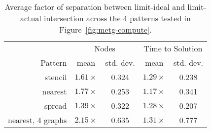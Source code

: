 \begin{table}[t]
\color{blue}
\centering
\small
\begin{tabular}{r | c | c | c | c}
        & \multicolumn{2}{|c|}{Nodes} & \multicolumn{2}{|c}{Time to Solution} \\
Pattern & mean & std. dev. & mean & std. dev. \\
\hline
stencil & $1.61\times$ & 0.324 & $1.29\times$ & 0.238 \\
nearest & $1.77\times$ & 0.253 & $1.17\times$ & 0.341 \\
spread  & $1.39\times$ & 0.322 & $1.28\times$ & 0.207 \\
nearest, 4 graphs & $2.15\times$ & 0.635 & $1.31\times$ & 0.777
\end{tabular}

\vspace{-0.20cm}
\caption{\color{blue} Average factor of separation between limit-ideal and limit-actual intersection across the 4 patterns tested in Figure~\ref{fig:metg-compute}.\label{tab:metg-predict-strong}}
\vspace{-0.5cm}
\end{table}

